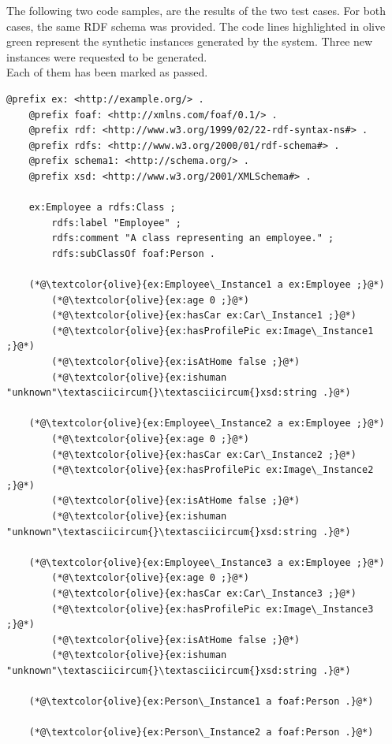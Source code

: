 The following two code samples, are the results of the two test cases. For both cases, the same RDF schema was provided. The code lines highlighted in olive green represent the synthetic instances generated by the system. Three new instances were requested to be generated.
\\
Each of them has been marked as passed.
\\
\begin{lstlisting}[caption={Result Test Case 1.1}, label={lst:three-rdf-instances}]
    @prefix ex: <http://example.org/> .
    @prefix foaf: <http://xmlns.com/foaf/0.1/> .
    @prefix rdf: <http://www.w3.org/1999/02/22-rdf-syntax-ns#> .
    @prefix rdfs: <http://www.w3.org/2000/01/rdf-schema#> .
    @prefix schema1: <http://schema.org/> .
    @prefix xsd: <http://www.w3.org/2001/XMLSchema#> .
    
    ex:Employee a rdfs:Class ;
        rdfs:label "Employee" ;
        rdfs:comment "A class representing an employee." ;
        rdfs:subClassOf foaf:Person .
    
    (*@\textcolor{olive}{ex:Employee\_Instance1 a ex:Employee ;}@*)
        (*@\textcolor{olive}{ex:age 0 ;}@*)
        (*@\textcolor{olive}{ex:hasCar ex:Car\_Instance1 ;}@*)
        (*@\textcolor{olive}{ex:hasProfilePic ex:Image\_Instance1 ;}@*)
        (*@\textcolor{olive}{ex:isAtHome false ;}@*)
        (*@\textcolor{olive}{ex:ishuman "unknown"\textasciicircum{}\textasciicircum{}xsd:string .}@*)
    
    (*@\textcolor{olive}{ex:Employee\_Instance2 a ex:Employee ;}@*)
        (*@\textcolor{olive}{ex:age 0 ;}@*)
        (*@\textcolor{olive}{ex:hasCar ex:Car\_Instance2 ;}@*)
        (*@\textcolor{olive}{ex:hasProfilePic ex:Image\_Instance2 ;}@*)
        (*@\textcolor{olive}{ex:isAtHome false ;}@*)
        (*@\textcolor{olive}{ex:ishuman "unknown"\textasciicircum{}\textasciicircum{}xsd:string .}@*)
    
    (*@\textcolor{olive}{ex:Employee\_Instance3 a ex:Employee ;}@*)
        (*@\textcolor{olive}{ex:age 0 ;}@*)
        (*@\textcolor{olive}{ex:hasCar ex:Car\_Instance3 ;}@*)
        (*@\textcolor{olive}{ex:hasProfilePic ex:Image\_Instance3 ;}@*)
        (*@\textcolor{olive}{ex:isAtHome false ;}@*)
        (*@\textcolor{olive}{ex:ishuman "unknown"\textasciicircum{}\textasciicircum{}xsd:string .}@*)
    
    (*@\textcolor{olive}{ex:Person\_Instance1 a foaf:Person .}@*)
    
    (*@\textcolor{olive}{ex:Person\_Instance2 a foaf:Person .}@*)
    

\end{lstlisting}
